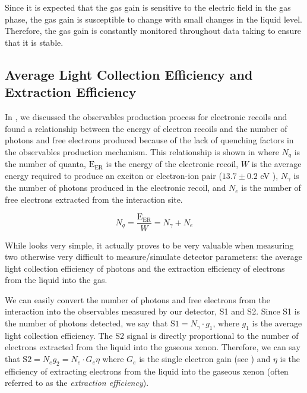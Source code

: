 Since it is expected that the gas gain is sensitive to the electric field in the gas phase, the gas gain is susceptible to change with small changes in the liquid level.  Therefore, the gas gain is constantly monitored throughout data taking to ensure that it is stable.


\subsection{Average Light Collection Efficiency and Extraction Efficiency}
\label{sec:xe1t_anticorrelation}


In , we discussed the observables production process for electronic recoils and found a relationship between the energy of electron recoils and the number of photons and free electrons produced because of the lack of quenching factors in the observables production mechanism.  This relationship is shown in  where $N_q$ is the number of quanta, $\textrm{E}_{\textrm{ER}}$ is the energy of the electronic recoil, $W$ is the average energy required to produce an exciton or electron-ion pair ($13.7 \pm 0.2$ eV \cite{dahl_thesis}), $N_{\gamma}$ is the number of photons produced in the electronic recoil, and $N_e$ is the number of free electrons extracted from the interaction site.

\begin{equation}
        \label{eqn:xe1t_anticorrelation}
        N_q = \frac{\textrm{E}_{\textrm{ER}}}{W} = N_{\gamma} + N_{e}
\end{equation}

While  looks very simple, it actually proves to be very valuable when measuring two otherwise very difficult to measure/simulate detector parameters: the average light collection efficiency of photons and the extraction efficiency of electrons from the liquid into the gas.  

We can easily convert the number of photons and free electrons from the interaction into the observables measured by our detector, S1 and S2.  Since S1 is the number of photons detected, we say that $\textrm{S1} = N_{\gamma} \cdot g_1$, where $g_1$ is the average light collection efficiency.  The S2 signal is directly proportional to the number of electrons extracted from the liquid into the gaseous xenon.  Therefore, we can say that $\textrm{S2} = N_e g_2 = N_e \cdot G_e \eta$ where $G_e$ is the single electron gain (see ) and $\eta$ is the efficiency of extracting electrons from the liquid into the gaseous xenon (often referred to as the \textit{extraction efficiency}).

